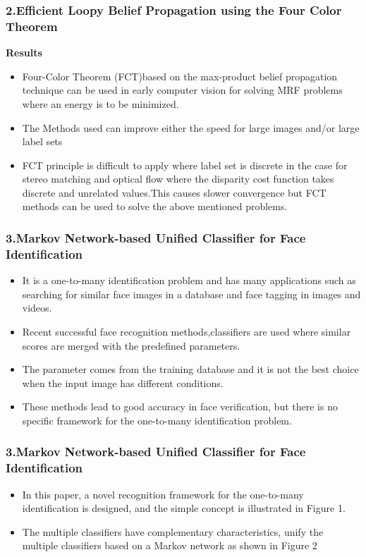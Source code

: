 \documentclass{beamer}
\begin{document}
\begin{frame}
\frametitle{\textbf{2.Efficient Loopy Belief Propagation using the Four Color Theorem}}
\textbf{Results}
\begin{itemize}
\item Four-Color Theorem (FCT)based on the max-product
belief propagation technique can be used in early computer vision for solving
MRF problems where an energy is to be minimized.
\item The  Methods used can  improve either the
speed for large images and/or large label sets
\item FCT principle is difficult to apply  where label set is discrete in the case for stereo matching and optical flow where the
disparity cost function takes discrete and unrelated values.This causes slower
convergence but FCT methods  can  be used to solve the above mentioned problems.
\end{itemize}
\end{frame}
\begin{frame}
\frametitle{\textbf{3.Markov Network-based Unified Classifier for Face Identification}}
\begin{itemize}
\item It is a one-to-many identification problem  and has many applications such
as searching for similar face images in a database and face tagging in images and videos.
\item Recent successful face recognition methods,classifiers are  used where similar scores are merged with the predefined parameters.
\item The parameter comes from the training database and it is not the best choice when the input image has different conditions.
\item These methods lead to good accuracy in face verification, but there is no specific framework for the one-to-many identification problem.
\end{itemize}
\end{frame}

\begin{frame}
\frametitle{\textbf{3.Markov Network-based Unified Classifier for Face Identification}}
\begin{itemize}
\item In this paper, a novel recognition framework for the one-to-many identification  is designed, and the simple concept is illustrated in Figure 1.
\item The multiple classifiers have complementary characteristics, unify the multiple classifiers based on a Markov network as shown in Figure 2
\end{itemize}
\end{frame}
\end{document}
